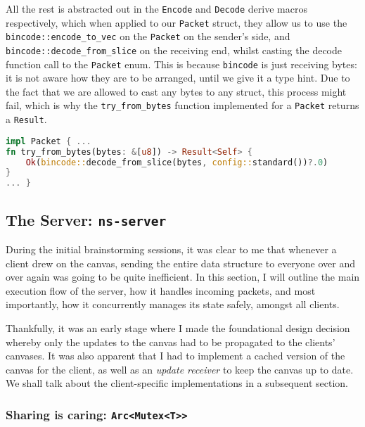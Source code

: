 \documentclass{article}
\newcommand{\code}[1]{\texttt{#1}}
\begin{document}

All the rest is abstracted out in the \code{Encode} and \code{Decode} derive
macros respectively, which when applied to our \code{Packet} struct, they allow
us to use the \code{bincode::encode\_to\_vec} on the \code{Packet} on the
sender's side, and \code{bincode::decode\_from\_slice} on the receiving end,
whilst casting the decode function call to the \code{Packet} enum. This is
because \code{bincode} is just receiving bytes: it is not aware how they are to
be arranged, until we give it a type hint. Due to the fact that we are allowed to cast
any bytes to any struct, this process might fail, which is why the
\code{try\_from\_bytes} function implemented for a \code{Packet} returns a \code{Result}.

{
\lstset{xleftmargin=0\textwidth, xrightmargin=0\textwidth}
\begin{subbox}{}
    \begin{lstlisting}[language=Rust]
impl Packet { ...
fn try_from_bytes(bytes: &[u8]) -> Result<Self> {
    Ok(bincode::decode_from_slice(bytes, config::standard())?.0)
}
... }
\end{lstlisting}
\end{subbox}
}

\newpage

\subsection{The Server: \code{ns-server}}

During the initial brainstorming sessions, it was clear to me that whenever a
client drew on the canvas, sending the entire data structure to everyone over
and over again was going to be quite inefficient. In this section, I will
outline the main execution flow of the server, how it handles incoming packets,
and most importantly, how it concurrently manages its state safely, amongst all
clients.

Thankfully, it was an early stage where I made the foundational design decision
whereby only the updates to the canvas had to be propagated to the clients'
canvases. It was also apparent that I had to implement a cached version of the
canvas for the client, as well as an \textit{update receiver} to keep the canvas
up to date. We shall talk about the client-specific implementations in a
subsequent section.


\subsubsection{Sharing is caring: \code{Arc<Mutex<T>{>}}}
\end{document}
